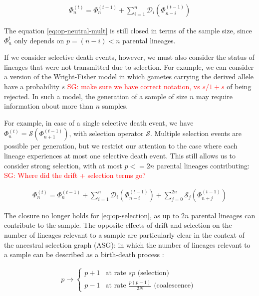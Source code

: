 \documentclass[review]{elsarticle}
\newcommand{\ra}{\rightarrow}
\newcommand{\sgcomment}[1]{\textcolor{red}{SG: #1}}
\begin{document}
\begin{align}
  \label{eq:op-neutral-mult}
  \Phi_{n}^{(t)}=\Phi_{n}^{(t-1)}+\sum_{i=1}^{n}\mathcal{D}_i(\Phi_{n-i}^{(t-1)})
\end{align}

The equation \eqref{eq:op-neutral-mult} is still closed in terms of the sample size, since
$\Phi_{n}^{t}$ only depends on $p=(n-i)<n$ parental lineages. 


If we consider selective death events, however, we must also consider the status of lineages that were not transmitted due to selection. For example, we can consider a version of the Wright-Fisher model in which gametes carrying the derived allele have a probability $s$ \sgcomment{make sure we have correct notation, vs $s/1+s$} of being rejected. In such a model, the generation of a sample of size $n$ may require information about more than $n$ samples. 
 
For
example, in case of a single selective death event, we have
$\Phi_{n}^{(t)}=\mathcal{S}(\Phi_{n+1}^{(t-1)})$, with selection operator $\mathcal{S}$. Multiple
selection events are possible per generation, but we restrict our attention to the case where each
lineage experiences at most one selective death event. This still allows us to consider strong
selection, with at most $p<=2n$ parental lineages contributing: \sgcomment{Where did the drift + selection terms go?}

\begin{align}
  \label{eq:op-selection}
  \Phi_{n}^{(t)}=\Phi_{n}^{(t-1)}+\sum_{i=1}^{n}\mathcal{D}_i(\Phi_{n-i}^{(t-1)}) + \sum_{j=0}^{2n}\mathcal{S}_j(\Phi_{n+j}^{(t-1)})
\end{align}

The closure no longer holds for \eqref{eq:op-selection}, as up to $2n$ parental lineages can
contribute to the sample. The opposite effects of drift and selection on the number of lineages relevant to a sample are particularly clear in the context of the ancestral selection graph (ASG): in which the number of lineages relevant to a sample can be described as a birth-death process
\cite{KroneNeuhauser1997, Wakeley2009}:

\begin{align}
  \label{eq:asg-size}
  p \ra \begin{cases}
      p+1 & \text{at rate } sp  \text{ (selection) }\\
      p-1 & \text{at rate } \frac{p (p-1)}{2N} \text{ (coalescence) }
    \end{cases}
\end{align}
\end{document}
